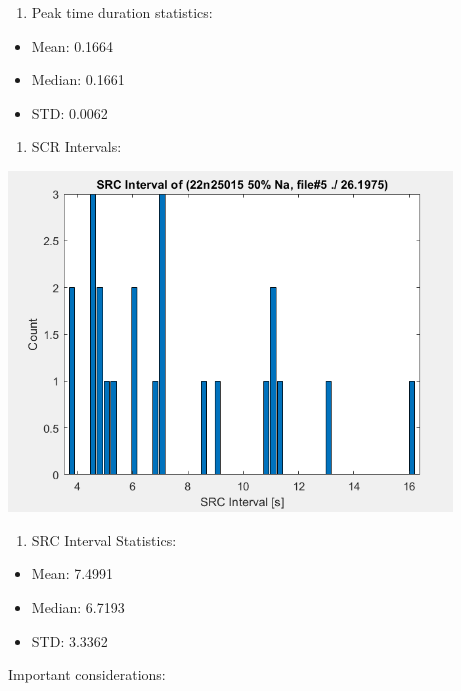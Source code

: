 \begin{enumerate}
\def\labelenumi{\arabic{enumi}.}
\setcounter{enumi}{2}
\item
  Peak time duration statistics:
\end{enumerate}

\begin{itemize}
\item
  Mean: 0.1664
\item
  Median: 0.1661
\item
  STD: 0.0062
\end{itemize}

\begin{enumerate}
\def\labelenumi{\arabic{enumi}.}
\setcounter{enumi}{3}
\item
  SCR Intervals:
\end{enumerate}

\includegraphics[width=4.63039in,height=3.55419in]{media/image43.png}

\begin{enumerate}
\def\labelenumi{\arabic{enumi}.}
\setcounter{enumi}{4}
\item
  SRC Interval Statistics:
\end{enumerate}

\begin{itemize}
\item
  Mean: 7.4991
\item
  Median: 6.7193
\item
  STD: 3.3362
\end{itemize}

Important considerations:

